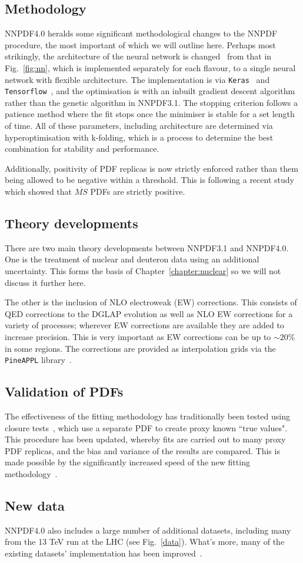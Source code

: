 \subsection{Methodology}
NNPDF4.0 heralds some significant methodological changes to the NNPDF procedure, the most important of which we will outline here. Perhaps most strikingly, the architecture of the neural network is changed~\cite{Carrazza:2019mzf} from that in Fig.~\ref{fig:nn}, which is implemented separately for each flavour, to a single neural network with flexible architecture. The implementation is via \texttt{Keras}~\cite{keras} and \texttt{Tensorflow}~\cite{tensorflow}, and the optimisation is with an inbuilt gradient descent algorithm rather than the genetic algorithm in NNPDF3.1. The stopping criterion follows a patience method where the fit stops once the minimiser is stable for a set length of time. All of these parameters, including architecture are determined via hyperoptimisation with k-folding, which is a process to determine the best combination for stability and performance.

Additionally, positivity of PDF replicas is now strictly enforced rather than them being allowed to be negative within a threshold. This is following a recent study~\cite{Candido:2020yat} which showed that $\overline{MS}$ PDFs are strictly positive. 

\subsection{Theory developments}
There are two main theory developments between NNPDF3.1 and NNPDF4.0. One is the treatment of nuclear and deuteron data using an additional uncertainty. This forms the basis of Chapter~\ref{chapter:nuclear} so we will not discuss it further here.

The other is the inclusion of NLO electroweak (EW) corrections. This consists of QED corrections to the DGLAP evolution as well as NLO EW corrections for a variety of processes; wherever EW corrections are available they are added to increase precision. This is very important as EW corrections can be up to $\sim 20\%$~\cite{Hollik:2004dz} in some regions. The corrections are provided as interpolation grids via the \texttt{PineAPPL} library~\cite{Carrazza:2020gss}.  

\subsection{Validation of PDFs}
The effectiveness of the fitting methodology has traditionally  been tested using closure tests~\cite{Ball:2014uwa}, which use a separate PDF to create proxy known ``true values". This procedure has been updated, whereby fits are carried out to many proxy PDF replicas, and the bias and variance of the results are compared. This is made possible by the significantly increased speed of the new fitting methodology~\cite{Carrazza:2019mzf}.

\subsection{New data}
NNPDF4.0 also includes a large number of additional datasets, including many from the 13 TeV run at the LHC (see Fig.~\ref{data}). What's more, many of the existing datasets' implementation has been improved~\cite{EmanueleTalk}.

